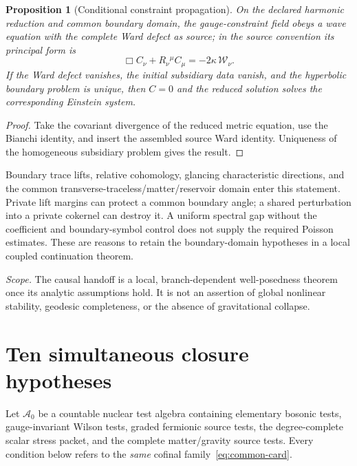 \documentclass[11pt,a4paper,oneside]{book}
\theoremstyle{plain}
\newtheorem{proposition}[theorem]{Proposition}
\theoremstyle{definition}
\theoremstyle{remark}
\renewcommand{\AA}{\mathcal A}
\newcommand{\src}[2]{\cite{#1}}
\newcommand{\scope}[1]{\par\smallskip\noindent\textit{Scope.} #1\par\smallskip}
\begin{document}
\begin{proposition}[Conditional constraint propagation]
\label{prop:constraint-propagation}
On the declared harmonic reduction and common boundary domain, the gauge-constraint field obeys a wave equation with the complete Ward defect as source; in the source convention its principal form is
\begin{equation}
 \Box C_\nu+R_\nu{}^\mu C_\mu
 =-2\kappa\,\mathcal W_\nu.
 \label{eq:subsidiary}
\end{equation}
If the Ward defect vanishes, the initial subsidiary data vanish, and the hyperbolic boundary problem is unique, then $C=0$ and the reduced solution solves the corresponding Einstein system.
\end{proposition}
\begin{proof}
Take the covariant divergence of the reduced metric equation, use the Bianchi identity, and insert the assembled source Ward identity. Uniqueness of the homogeneous subsidiary problem gives the result.
\end{proof}
\src{R2}{thm:v2v95-constraint-equation}

Boundary trace lifts, relative cohomology, glancing characteristic directions, and the common transverse-traceless/matter/reservoir domain enter this statement. Private lift margins can protect a common boundary angle; a shared perturbation into a private cokernel can destroy it. A uniform spectral gap without the coefficient and boundary-symbol control does not supply the required Poisson estimates. These are reasons to retain the boundary-domain hypotheses in a local coupled continuation theorem. \cite{R1,R2}

\scope{The causal handoff is a local, branch-dependent well-posedness theorem once its analytic assumptions hold. It is not an assertion of global nonlinear stability, geodesic completeness, or the absence of gravitational collapse.}

\section{Ten simultaneous closure hypotheses}
Let $\AA_0$ be a countable nuclear test algebra containing elementary bosonic tests, gauge-invariant Wilson tests, graded fermionic source tests, the degree-complete scalar stress packet, and the complete matter/gravity source tests. Every condition below refers to the \emph{same} cofinal family~\eqref{eq:common-card}.
\end{document}
